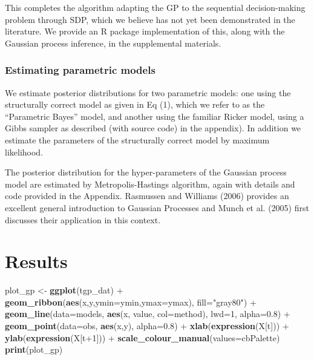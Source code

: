 \documentclass[author-year, review]{elsarticle} %
\newenvironment{Shaded}{}{}
\newcommand{\KeywordTok}[1]{\textcolor[rgb]{0.00,0.44,0.13}{\textbf{{#1}}}}
\newcommand{\DataTypeTok}[1]{\textcolor[rgb]{0.56,0.13,0.00}{{#1}}}
\newcommand{\DecValTok}[1]{\textcolor[rgb]{0.25,0.63,0.44}{{#1}}}
\newcommand{\FloatTok}[1]{\textcolor[rgb]{0.25,0.63,0.44}{{#1}}}
\newcommand{\StringTok}[1]{\textcolor[rgb]{0.25,0.44,0.63}{{#1}}}
\newcommand{\NormalTok}[1]{{#1}}
\begin{document}
This completes the algorithm adapting the GP to the sequential
decision-making problem through SDP, which we believe has not yet been
demonstrated in the literature. We provide an R package implementation
of this, along with the Gaussian process inference, in the supplemental
materials.

\subsubsection{Estimating parametric models}

We estimate posterior distributions for two parametric models: one using
the structurally correct model as given in Eq (1), which we refer to as
the ``Parametric Bayes'' model, and another using the familiar Ricker
model, using a Gibbs sampler as described (with source code) in the
appendix). In addition we estimate the parameters of the structurally
correct model by maximum likelihood.

The posterior distribution for the hyper-parameters of the Gaussian
process model are estimated by Metropolis-Hastings algorithm, again with
details and code provided in the Appendix. Rasmussen and Williams (2006)
provides an excellent general introduction to Gaussian Processes and
Munch et al. (2005) first discusses their application in this context.

\section{Results}

\begin{Shaded}
\begin{Highlighting}[]
\NormalTok{plot_gp <- }\KeywordTok{ggplot}\NormalTok{(tgp_dat) + }\KeywordTok{geom_ribbon}\NormalTok{(}\KeywordTok{aes}\NormalTok{(x,y,}\DataTypeTok{ymin=}\NormalTok{ymin,}\DataTypeTok{ymax=}\NormalTok{ymax), }\DataTypeTok{fill=}\StringTok{"gray80"}\NormalTok{) +}
    \KeywordTok{geom_line}\NormalTok{(}\DataTypeTok{data=}\NormalTok{models, }\KeywordTok{aes}\NormalTok{(x, value, }\DataTypeTok{col=}\NormalTok{method), }\DataTypeTok{lwd=}\DecValTok{1}\NormalTok{, }\DataTypeTok{alpha=}\FloatTok{0.8}\NormalTok{) + }
    \KeywordTok{geom_point}\NormalTok{(}\DataTypeTok{data=}\NormalTok{obs, }\KeywordTok{aes}\NormalTok{(x,y), }\DataTypeTok{alpha=}\FloatTok{0.8}\NormalTok{) + }
    \KeywordTok{xlab}\NormalTok{(}\KeywordTok{expression}\NormalTok{(X[t])) + }\KeywordTok{ylab}\NormalTok{(}\KeywordTok{expression}\NormalTok{(X[t}\DecValTok{+1}\NormalTok{])) +}
    \KeywordTok{scale_colour_manual}\NormalTok{(}\DataTypeTok{values=}\NormalTok{cbPalette) }
\KeywordTok{print}\NormalTok{(plot_gp)}
\end{Highlighting}
\end{Shaded}
\end{document}
